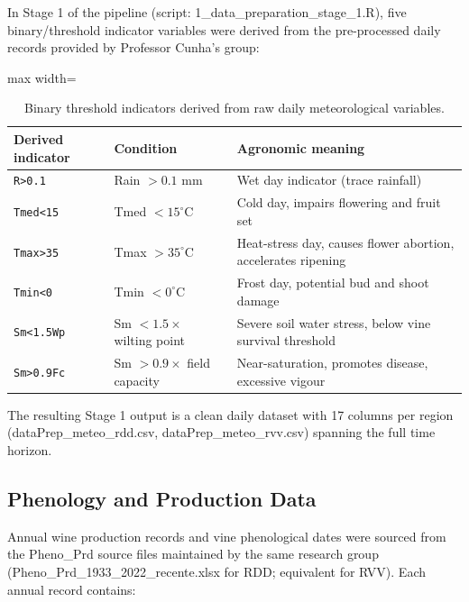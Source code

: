 In Stage 1 of the pipeline (script: 1\_data\_preparation\_stage\_1.R), five binary/threshold indicator variables were derived from the pre-processed daily records provided by Professor Cunha's group:

\begin{table}[htbp]
  \centering
  \caption{Binary threshold indicators derived from raw daily meteorological variables.}\label{tab:ch3d_2}
  \small
  \begin{adjustbox}{max width=\textwidth}
    \begin{tabularx}{\textwidth}{p{3cm} p{3.5cm} X}
    \toprule
    \textbf{Derived indicator} & \textbf{Condition} & \textbf{Agronomic meaning} \\
    \midrule
    \texttt{R>0.1}    & Rain $> 0.1$ mm                       & Wet day indicator (trace rainfall) \\
    \texttt{Tmed<15}  & Tmed $< 15^\circ$C                    & Cold day, impairs flowering and fruit set \\
    \texttt{Tmax>35}  & Tmax $> 35^\circ$C                    & Heat-stress day, causes flower abortion, accelerates ripening \\
    \texttt{Tmin<0}   & Tmin $< 0^\circ$C                     & Frost day, potential bud and shoot damage \\
    \texttt{Sm<1.5Wp} & Sm $< 1.5 \times$ wilting point       & Severe soil water stress, below vine survival threshold \\
    \texttt{Sm>0.9Fc} & Sm $> 0.9 \times$ field capacity      & Near-saturation, promotes disease, excessive vigour \\
    \bottomrule
  \end{tabularx}
  \end{adjustbox}

\end{table}


The resulting Stage 1 output is a clean daily dataset with 17 columns per region (dataPrep\_meteo\_rdd.csv, dataPrep\_meteo\_rvv.csv) spanning the full time horizon.


\subsection{Phenology and Production Data}\label{sub:phenology_and_production_data}

Annual wine production records and vine phenological dates were sourced from the Pheno\_Prd source files maintained by the same research group (Pheno\_Prd\_1933\_2022\_recente.xlsx for RDD; equivalent for RVV). Each annual record contains:

